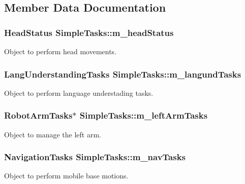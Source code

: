 \subsection{Member Data Documentation}
\subsubsection[{\texorpdfstring{m\+\_\+head\+Status}{m_headStatus}}]{\setlength{\rightskip}{0pt plus 5cm}Head\+Status Simple\+Tasks\+::m\+\_\+head\+Status\hspace{0.3cm}{\ttfamily [private]}}\hypertarget{class_simple_tasks_ad01bd034086c0ff10994e0afae9a3398}{}\label{class_simple_tasks_ad01bd034086c0ff10994e0afae9a3398}
Object to perform head movements. 
\subsubsection[{\texorpdfstring{m\+\_\+langund\+Tasks}{m_langundTasks}}]{\setlength{\rightskip}{0pt plus 5cm}Lang\+Understanding\+Tasks Simple\+Tasks\+::m\+\_\+langund\+Tasks\hspace{0.3cm}{\ttfamily [private]}}\hypertarget{class_simple_tasks_a4cf498d52ac2f3f0cf8eff17688a876d}{}\label{class_simple_tasks_a4cf498d52ac2f3f0cf8eff17688a876d}
Object to perform language understading tasks. 
\subsubsection[{\texorpdfstring{m\+\_\+left\+Arm\+Tasks}{m_leftArmTasks}}]{\setlength{\rightskip}{0pt plus 5cm}Robot\+Arm\+Tasks$\ast$ Simple\+Tasks\+::m\+\_\+left\+Arm\+Tasks\hspace{0.3cm}{\ttfamily [private]}}\hypertarget{class_simple_tasks_ab3c7f040efb90602dda3167136ce15a5}{}\label{class_simple_tasks_ab3c7f040efb90602dda3167136ce15a5}
Object to manage the left arm. 
\subsubsection[{\texorpdfstring{m\+\_\+nav\+Tasks}{m_navTasks}}]{\setlength{\rightskip}{0pt plus 5cm}Navigation\+Tasks Simple\+Tasks\+::m\+\_\+nav\+Tasks\hspace{0.3cm}{\ttfamily [private]}}\hypertarget{class_simple_tasks_a187c187f5b0ca367535f506b6029f405}{}\label{class_simple_tasks_a187c187f5b0ca367535f506b6029f405}
Object to perform mobile base motions. 
